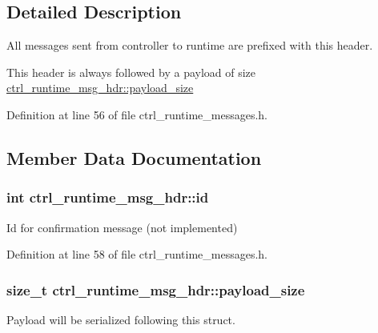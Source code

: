\subsection{Detailed Description}
All messages sent from controller to runtime are prefixed with this header. 

This header is always followed by a payload of size \hyperlink{structctrl__runtime__msg__hdr_a58295be6c498903d48cb6aa6cf651c01}{ctrl\-\_\-runtime\-\_\-msg\-\_\-hdr\-::payload\-\_\-size} 

Definition at line 56 of file ctrl\-\_\-runtime\-\_\-messages.\-h.



\subsection{Member Data Documentation}
\hypertarget{structctrl__runtime__msg__hdr_a108aad48b5396f75b3168a4f6d380b22}{
\subsubsection[{id}]{\setlength{\rightskip}{0pt plus 5cm}int ctrl\-\_\-runtime\-\_\-msg\-\_\-hdr\-::id}}\label{structctrl__runtime__msg__hdr_a108aad48b5396f75b3168a4f6d380b22}


Id for confirmation message (not implemented) 



Definition at line 58 of file ctrl\-\_\-runtime\-\_\-messages.\-h.

\hypertarget{structctrl__runtime__msg__hdr_a58295be6c498903d48cb6aa6cf651c01}{
\subsubsection[{payload\-\_\-size}]{\setlength{\rightskip}{0pt plus 5cm}size\-\_\-t ctrl\-\_\-runtime\-\_\-msg\-\_\-hdr\-::payload\-\_\-size}}\label{structctrl__runtime__msg__hdr_a58295be6c498903d48cb6aa6cf651c01}


Payload will be serialized following this struct. 



